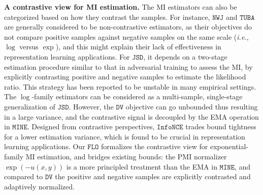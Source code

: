 \documentclass{article}
\theoremstyle{plain}
\theoremstyle{definition}
\theoremstyle{remark}
\newcommand{\infonce}{\texttt{InfoNCE}}
\newcommand{\TUBA}{\texttt{TUBA}}
\newcommand{\NWJ}{\texttt{NWJ}}
\newcommand{\DV}{\texttt{DV}}
\newcommand{\MINE}{\texttt{MINE}}
\newcommand{\FLO}{\texttt{FLO}}
\newcommand{\PMI}{\text{PMI}}
\renewcommand{\JSD}{\texttt{JSD}}
\begin{document}
		{\bf A contrastive view for MI estimation.} The MI estimators can also be categorized based on how they contrast the samples. For instance,  $\NWJ$ and $\TUBA$ are generally considered to be non-contrastive estimators, as their objectives do not compare positive samples against negative samples on the same scale ({\it i.e.}, $\log$ versus $\exp$), and this might explain their lack of effectiveness in representation learning applications. For $\JSD$, it depends on a two-stage estimation procedure similar to that in adversarial training to assess the MI, by explicitly contrasting positive and negative samples to estimate the likelihood ratio. This strategy has been reported to be unstable in many empirical settings. The $\log$-family estimators can be considered as a multi-sample, single-stage generalization of $\JSD$. However, the $\DV$ objective can go unbounded thus resulting in a large variance, and the contrastive signal is decoupled by the EMA operation in $\MINE$. Designed from contrastive perspectives, $\infonce$ trades bound tightness for a lower estimation variance, which is found to be crucial in representation learning applications. Our $\FLO$ formalizes the contrastive view for exponential-family MI estimation, and  bridges existing bounds: the $\PMI$ normalizer $\exp(-u(x,y))$ is a more principled treatment than the EMA in $\MINE$, and compared to $\DV$ the positive and negative samples are explicitly contrasted and adaptively normalized. 
		
\end{document}
